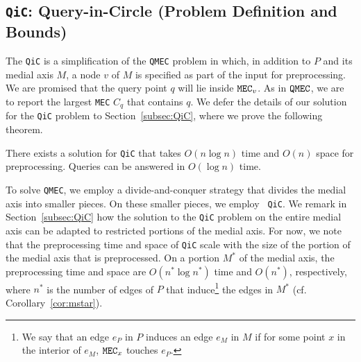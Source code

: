 \documentclass[12pt]{llncs}
\begin{document}
\subsection{{\tt QiC}: Query-in-Circle (Problem Definition and Bounds)} 
\label{qic_defn}
The {\tt QiC} is a simplification of the {\tt QMEC} problem in which, in addition to $P$ and its medial
axis $M$, a node $v$ of  $M$  is 
specified as part of the input for preprocessing. We are  promised that 
the query point $q$ will lie inside ${\tt MEC}_v$. As in ${\tt QMEC}$, we are to report 
the largest {\tt MEC} $C_q$ that contains $q$. We defer the details of our solution for the 
{\tt QiC} problem to Section\ \ref{subsec:QiC}, where we prove the following theorem.
\begin{theorem}\label{thm:qic}
There exists a solution for {\tt QiC} that takes $O(n \log n)$ time and $O(n)$ space for preprocessing.
Queries can be answered in $O(\log n)$ time.
\end{theorem}
To solve {\tt QMEC},  we employ a divide-and-conquer strategy that 
divides the medial axis into smaller pieces. On these smaller pieces, we employ {\tt 
QiC}. We remark in Section\ \ref{subsec:QiC} how the solution to the  {\tt QiC} 
problem on the entire medial axis can be adapted to restricted portions of the medial 
axis. For now, we note that the preprocessing time and space of {\tt QiC} scale with the size of the portion of the medial axis that is preprocessed.
On a  
portion $M^*$ of the medial axis, the preprocessing time and space are $O(n^* \log n^*)$ time and $O(n^*)$, respectively, where $n^*
$ is the number of edges of $P$ that induce\footnote{We say that an edge $e_P$ in 
$P$ induces an edge  $e_M$ in $M$ if for some point $x$ in the interior of $e_M$, ${\tt MEC}_x$ 
touches $e_P$.} the edges in $M^*$ (cf. Corollary\ \ref{cor:mstar}).
\end{document}
